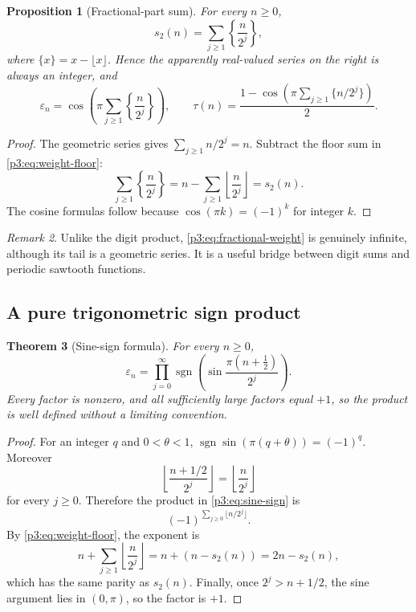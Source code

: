 \documentclass[11pt,oneside]{article}
\newtheorem{theorem}{Theorem}[section]
\newtheorem{proposition}[theorem]{Proposition}
\theoremstyle{definition}
\theoremstyle{remark}
\newtheorem{remark}[theorem]{Remark}
\newcommand{\swt}{s_2}
\newcommand{\sgn}{\operatorname{sgn}}
\newcommand{\eps}{\varepsilon}
\newcommand{\1}{\mathbf 1}
\begin{document}
\begin{proposition}[Fractional-part sum]
\label{p3:prop:fractional-weight}
For every \(n\ge0\),
\begin{equation}
 \boxed{\swt(n)=\sum_{j\ge1}\left\{\frac{n}{2^j}\right\}},
 \label{p3:eq:fractional-weight}
\end{equation}
where \(\{x\}=x-\lfloor x\rfloor\).  Hence the apparently real-valued series on the right is
always an integer, and
\begin{equation}
 \eps_n=\cos\!\left(\pi\sum_{j\ge1}\left\{\frac n{2^j}\right\}\right),
 \qquad
 \tau(n)=\frac{1-\cos\!\left(\pi\sum_{j\ge1}\{n/2^j\}\right)}2.
 \label{p3:eq:fractional-cos}
\end{equation}
\end{proposition}

\begin{proof}
The geometric series gives \(\sum_{j\ge1}n/2^j=n\).  Subtract the floor sum in
\eqref{p3:eq:weight-floor}:
\[
 \sum_{j\ge1}\left\{\frac n{2^j}\right\}
 =n-\sum_{j\ge1}\left\lfloor\frac n{2^j}\right\rfloor
 =\swt(n).
\]
The cosine formulas follow because \(\cos(\pi k)=(-1)^k\) for integer \(k\).
\end{proof}

\begin{remark}
Unlike the digit product, \eqref{p3:eq:fractional-weight} is genuinely infinite, although its
tail is a geometric series.  It is a useful bridge between digit sums and periodic
sawtooth functions.
\end{remark}

\subsection{A pure trigonometric sign product}

\begin{theorem}[Sine-sign formula]
\label{p3:thm:sine-sign}
For every \(n\ge0\),
\begin{equation}
 \boxed{
 \eps_n=
 \prod_{j=0}^{\infty}
 \sgn\!\left(\sin\!\frac{\pi(n+\tfrac12)}{2^j}\right).}
 \label{p3:eq:sine-sign}
\end{equation}
Every factor is nonzero, and all sufficiently large factors equal \(+1\), so the product is
well defined without a limiting convention.
\end{theorem}

\begin{proof}
For an integer \(q\) and \(0<\theta<1\),
\(\sgn\sin(\pi(q+\theta))=(-1)^q\).  Moreover
\[
 \left\lfloor\frac{n+1/2}{2^j}\right\rfloor
 =\left\lfloor\frac n{2^j}\right\rfloor
\]
for every \(j\ge0\).  Therefore the product in \eqref{p3:eq:sine-sign} is
\[
 (-1)^{\sum_{j\ge0}\lfloor n/2^j\rfloor}.
\]
By \eqref{p3:eq:weight-floor}, the exponent is
\[
 n+\sum_{j\ge1}\left\lfloor\frac n{2^j}\right\rfloor
 =n+(n-\swt(n))=2n-\swt(n),
\]
which has the same parity as \(\swt(n)\).  Finally, once \(2^j>n+1/2\), the sine argument lies
in \((0,\pi)\), so the factor is \(+1\).
\end{proof}
\end{document}
